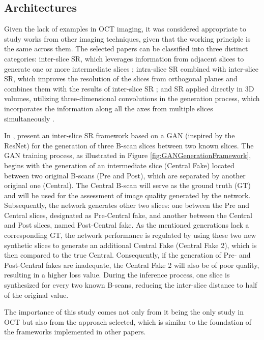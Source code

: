 \subsection{Architectures}
Given the lack of examples in OCT imaging, it was considered appropriate to study works from other imaging techniques, given that the working principle is the same across them. The selected papers can be classified into three distinct categories: inter-slice SR, which leverages information from adjacent slices to generate one or more intermediate slices \parencite{Lopez2023, Xia2021, Wu2022, Nishimoto2024}; intra-slice SR combined with inter-slice SR, which improves the resolution of the slices from orthogonal planes and combines them with the results of inter-slice SR \parencite{Zhang2024, Fang2022, Nimitha2024, Georgescu2020}; and SR applied directly in 3D volumes, utilizing three-dimensional convolutions in the generation process, which incorporates the information along all the axes from multiple slices simultaneously \parencite{YChen2018, Sanchez2018, Kudo2019, Zhang2022}.
\par
In \textcite{Lopez2023}, present an inter-slice SR framework based on a GAN (inspired by the ResNet) for the generation of three B-scan slices between two known slices. The GAN training process, as illustrated in Figure \ref{fig:GANGenerationFramework}, begins with the generation of an intermediate slice (Central Fake) located between two original B-scans (Pre and Post), which are separated by another original one (Central). The Central B-scan will serve as the ground truth (GT) and will be used for the assessment of image quality generated by the network. Subsequently, the network generates other two slices: one between the Pre and Central slices, designated as Pre-Central fake, and another between the Central and Post slices, named Post-Central fake. As the mentioned generations lack a corresponding GT, the network performance is regulated by using these two new synthetic slices to generate an additional Central Fake (Central Fake 2), which is then compared to the true Central. Consequently, if the generation of Pre- and Post-Central fakes are inadequate, the Central Fake 2 will also be of poor quality, resulting in a higher loss value. During the inference process, one slice is synthesized for every two known B-scans, reducing the inter-slice distance to half of the original value.
\par
The importance of this study comes not only from it being the only study in OCT but also from the approach selected, which is similar to the foundation of the frameworks implemented in other papers. 

